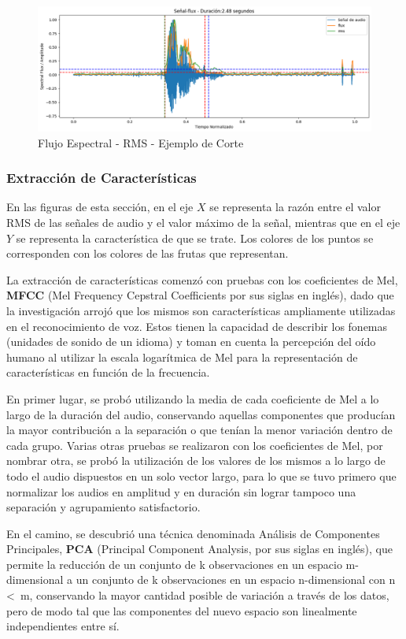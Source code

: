 \documentclass[a4paper, 12pt]{article}
\begin{document}
\begin{figure}[h]
    \centering
    \includegraphics[width=0.8\linewidth]{trimming4.png}
    \caption{Flujo Espectral - RMS - Ejemplo de Corte}
    \label{trimming 4}
\end{figure}
\subsubsection{Extracción de Características}
En las figuras de esta sección, en el eje \(X\) se representa la razón entre el valor RMS de las señales de audio y el valor máximo de la señal, mientras que en el eje \(Y\) se representa la característica de que se trate. Los colores de los puntos se corresponden con los colores de las frutas que representan.

La extracción de características comenzó con pruebas con los coeficientes de Mel, \textbf{MFCC} (Mel Frequency Cepstral Coefficients por sus siglas en inglés), dado que la investigación arrojó que los mismos son características ampliamente utilizadas en el reconocimiento de voz. Estos tienen la capacidad de describir los fonemas (unidades de sonido de un idioma) y toman en cuenta la percepción del oído humano al utilizar la escala logarítmica de Mel para la representación de características en función de la frecuencia.

En primer lugar, se probó utilizando la media de cada coeficiente de Mel a lo largo de la duración del audio, conservando aquellas componentes que producían la mayor contribución a la separación o que tenían la menor variación dentro de cada grupo. Varias otras pruebas se realizaron con los coeficientes de Mel, por nombrar otra, se probó la utilización de los valores de los mismos a lo largo de todo el audio dispuestos en un solo vector largo, para lo que se tuvo primero que normalizar los audios en amplitud y en duración sin lograr tampoco una separación y agrupamiento satisfactorio.

En el camino, se descubrió una técnica denominada Análisis de Componentes Principales, \textbf{PCA} (Principal Component Analysis, por sus siglas en inglés), que permite la reducción de un conjunto de k observaciones en un espacio m-dimensional a un conjunto de k observaciones en un espacio n-dimensional con n \textless\ m, conservando la mayor cantidad posible de variación a través de los datos, pero de modo tal que las componentes del nuevo espacio son linealmente independientes entre sí.
\end{document}
